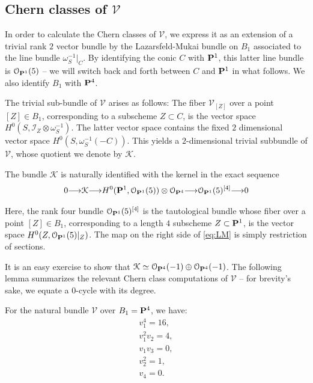 \documentclass[12pt,reqno]{amsart}
\renewcommand{\to}{{\longrightarrow}}
\numberwithin{equation}{section}
\renewcommand{\O}{\mathcal O}
\newcommand{\V}{\mathcal V}
\begin{document}
\subsection{Chern classes of $\V$}
\label{sec:chern-classes-b_1}

In order to calculate the Chern classes of $\V$, we express it as an
extension of a trivial rank $2$ vector bundle by the Lazarsfeld-Mukai
bundle on $B_1$ associated to the line bundle
$\omega_{S}^{-1}|_{C}$. By identifying the conic $C$ with $\P^{1}$,
this latter line bundle is $\O_{\P^{1}}(5)$ -- we will switch back and
forth between $C$ and $\P^{1}$ in what follows.  We also identify
$B_{1}$ with $\P^{4}$.


The trivial sub-bundle of $\V$ arises as follows: The fiber $\V_{[Z]}$
over a point $[Z] \in B_1$, corresponding to a subscheme
$Z \subset C$, is the vector space
$H^{0}(S, \mathcal{I}_{Z} \otimes \omega_{S}^{-1})$.  The latter
vector space contains the fixed $2$ dimensional vector space
$H^{0}(S, \omega_{S}^{-1}(-C))$.  This yields a $2$-dimensional
trivial subbundle of $\V$, whose quotient we denote by $\mathcal{K}$.


The bundle $\mathcal{K}$ is naturally identified with the kernel in
the exact sequence
\begin{align}
  \label{eq:LM}
  0 \to \mathcal{K} \to H^{0}(\P^1, \O_{\P^{1}}(5)) \otimes \O_{\P^4} \to \O_{\P^{1}}(5)^{[4]} \to 0 
\end{align}

Here, the rank four bundle $\O_{\P^{1}}(5)^{[4]}$ is the tautological
bundle whose fiber over a point $[Z] \in B_{1}$, corresponding to a
length $4$ subscheme $Z \subset \P^{1}$, is the vector space
$H^{0}(Z, \O_{\P^{1}}(5)|_{Z})$.  The map on the right side of
\eqref{eq:LM} is simply restriction of sections.

It is an easy exercise to show that
$\mathcal{K} \simeq \O_{\P^{4}}(-1) \oplus \O_{\P^{4}}(-1)$.  The
following lemma summarizes the relevant Chern class computations of
$\V$ -- for brevity's sake, we equate a $0$-cycle with its degree.

\begin{lemma}
  \label{lemma:chernB1}
  For the natural bundle $\V$ over $B_1= \P^{4}$, we have:
  \begin{align}\nonumber
    v_{1}^{4} = 16,\\\nonumber
    v_{1}^{2}v_{2} = 4,\\\nonumber
    v_{1}v_{3} =0,\\\nonumber
    v_2^{2} = 1,\\\nonumber
    v_{4} = 0.
  \end{align}
\end{lemma}
\end{document}
